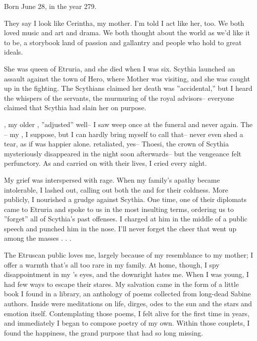 \documentclass[char]{Kos}
\begin{document}
\name{\cPoet{}}

Born June 28, in the year 279.

They say I look like Cerintha, my mother. I'm told I act like her, too. We both loved music and art and drama. We both thought about the world as we'd like it to be, a storybook land of passion and gallantry and people who hold to great ideals. 

She was queen of Etruria, and she died when I was six. Scythia launched an assault against the town of Hero, where Mother was visiting, and she was caught up in the fighting. The Scythians claimed her death was ''accidental,'' but I heard the whispers of the servants, the murmuring of the royal advisors-- everyone claimed that Scythia had slain her on purpose. 

\cGroom{}, my older \cGroom{\sibling}, ''adjusted'' well-- I saw \cGroom{\them} weep once at the funeral and never again. The \cEtruriaKing{\monarch}-- my \cEtruriaKing{\parent}, I suppose, but I can hardly bring myself to call \cEtruriaKing{\them} that-- never even shed a tear, as if \cEtruriaKing{\they} was happier alone. \cEtruriaKing{\They} retaliated, yes-- Thoesi, the crown  of Scythia mysteriously disappeared in the night soon afterwards-- but the vengeance felt perfunctory. As \cEtruriaKing{\they} and \cGroom{} carried on with their lives, I cried every night.

My grief was interspersed with rage. When my family's apathy became intolerable, I lashed out, calling out both the \cEtruriaKing{\monarch} and \cGroom{} for their coldness. More publicly, I nourished a grudge against Scythia. One time, one of their diplomats came to Etruria and spoke to us in the most insulting terms, ordering us to ''forget'' all of Scythia's past offenses. I charged at him in the middle of a public speech and punched him in the nose. I'll never forget the cheer that went up among the masses . . .

The Etruscan public loves me, largely because of my resemblance to my mother; I offer a warmth that's all too rare in my family. At home, though, I spy disappointment in my \cGroom{\sibling}'s eyes, and the \cEtruriaKing{\monarch} downright hates me. When I was young, I had few ways to escape their stares. My salvation came in the form of a little book I found in a library, an anthology of poems collected from long-dead Sabine authors. Inside were meditations on life, dirges, odes to the sun and the stars and emotion itself. Contemplating those poems, I felt alive for the first time in years, and immediately I began to compose poetry of my own. Within those couplets, I found the happiness, the grand purpose that had so long missing.
\end{document}
